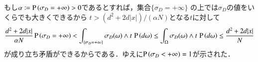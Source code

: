\begin{prf}
\begin{description}
		もし$\alpha \coloneqq \operatorname{P} \left(\sigma_D = +\infty\right) > 0$であるとすれば，集合$\{ \sigma_D = +\infty \}$
		の上では$\sigma_D$の値をいくらでも大きくできるから
		$t > (d^2 + 2d|x|)/(\alpha N)$となる$t$に対して
		\begin{align}
			\frac{d^2 + 2d|x|}{\alpha N} \operatorname{P} \left(\sigma_D = +\infty\right) 
			< \int_{\{\sigma_D = +\infty\}} \sigma_D(\omega) \wedge t\, \operatorname{P} \left(d\omega\right)
			\leq \int_{\Omega} \sigma_D(\omega) \wedge t\, \operatorname{P} \left(d\omega\right)
			\leq \frac{d^2 + 2d|x|}{N}
		\end{align}
		が成り立ち矛盾ができるからである．ゆえに$\operatorname{P} \left(\sigma_D < +\infty\right) = 1$が示された．
		\QED
\end{description}
\end{prf}